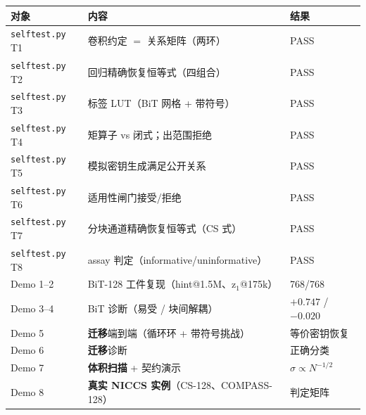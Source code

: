 \documentclass[11pt,a4paper]{ctexart}
\begin{document}
\begin{table}[htbp]\centering\small
\begin{tabular}{@{}lll@{}}
\toprule
对象 & 内容 & 结果 \\
\midrule
\texttt{selftest.py} T1 & 卷积约定 $=$ 关系矩阵（两环） & PASS \\
\texttt{selftest.py} T2 & 回归精确恢复恒等式（四组合） & PASS \\
\texttt{selftest.py} T3 & 标签 LUT（BiT 网格 + 带符号） & PASS \\
\texttt{selftest.py} T4 & 矩算子 vs 闭式；出范围拒绝 & PASS \\
\texttt{selftest.py} T5 & 模拟密钥生成满足公开关系 & PASS \\
\texttt{selftest.py} T6 & 适用性闸门接受/拒绝 & PASS \\
\texttt{selftest.py} T7 & 分块通道精确恢复恒等式（CS 式） & PASS \\
\texttt{selftest.py} T8 & assay 判定（informative/uninformative） & PASS \\
Demo 1--2 & BiT-128 工件复现（hint@1.5M、z$_1$@175k） & 768/768 \\
Demo 3--4 & BiT 诊断（易受 / 块间解耦） & $+0.747$ / $-0.020$ \\
Demo 5 & \textbf{迁移}端到端（循环环 + 带符号挑战） & 等价密钥恢复 \\
Demo 6 & \textbf{迁移}诊断 & 正确分类 \\
Demo 7 & \textbf{体积扫描} + 契约演示 & $\sigma\propto N^{-1/2}$ \\
Demo 8 & \textbf{真实 NICCS 实例}（CS-128、COMPASS-128） & 判定矩阵 \\
\bottomrule
\end{tabular}
\end{table}
\end{document}
